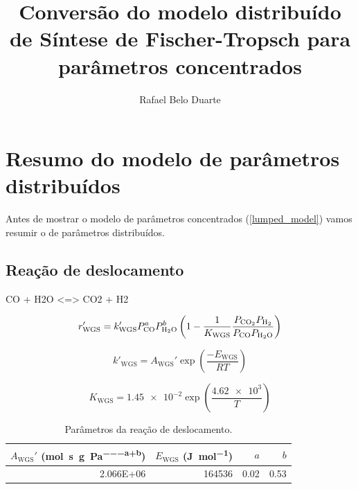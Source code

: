 \documentclass[portuguese,12pt,a4paper,onecolumn]{article}
\title{Conversão do modelo distribuído de Síntese de Fischer-Tropsch para parâmetros concentrados}
\author{Rafael Belo Duarte}
\begin{document}
	\maketitle
	\section{Resumo do modelo de parâmetros distribuídos}
	
	Antes de mostrar o modelo de parâmetros concentrados (\autoref{lumped_model}) vamos resumir o de parâmetros distribuídos.
	
	\subsection{Reação de deslocamento}
	
	\begin{reaction}
		CO + H2O <=> CO2 + H2
		\label{reac:WGS}
	\end{reaction}
	
	\begin{equation}
		r_\mathrm{WGS}' = k_{\mathrm{WGS}}' P_{\ce{CO}}^a P_{\ce{H2O}}^b  \left(1 - \frac{1}{K_{\mathrm{WGS}}} \frac{P_{\ce{CO2}} P_{\ce{H2}}}{P_{\ce{CO}} P_{\ce{H2O}}} \right)
		\label{eq:rate_CO2}
	\end{equation}
	
	\begin{equation}
		k'_\mathrm{WGS} = A_\mathrm{WGS}' \exp \left( \frac{-E_\mathrm{WGS}}{RT} \right)
		\label{eq:k_WGS}
	\end{equation}
	
	\begin{equation}
		K_{\mathrm{WGS}} = \num{1.45e-2} \exp \left( \frac{\num{4.62e3}}{T} \right)
		\label{eq:K_WGS}
	\end{equation}
	
	\begin{table}[!h]
		\centering
		\caption{Parâmetros da reação de deslocamento.}
		\label{tab:params_WGS}
			\begin{tabular}{rrrr}
				\toprule
				$A_{\mathrm{WGS}}'$ (\unit{\mole \per \second \per \gram \per \pascal^{a+b}}) & $E_{\mathrm{WGS}}$ (\unit{\joule \per \mole}) & $a$ & $b$ \\
				\midrule
				\num{2.066E+06} & \num{164536} & \num{0.02} & \num{0.53} \\
				\bottomrule
			\end{tabular}%
	\end{table}
	
\end{document}
